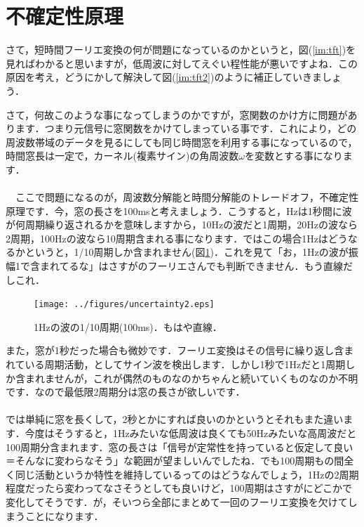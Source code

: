 \documentclass[11pt,a4paper]{ujreport} 	%
\begin{document}
\section{不確定性原理}
さて，短時間フーリエ変換の何が問題になっているのかというと，図(\ref{im:tft})を見ればわかると思いますが，低周波に対してえぐい程性能が悪いですよね．この原因を考え，どうにかして解決して図(\ref{im:tft2})のように補正していきましょう．

さて，何故このような事になってしまうのかですが，窓関数のかけ方に問題があります．つまり元信号に窓関数をかけてしまっている事です．これにより，どの周波数帯域のデータを見るにしても同じ時間窓を利用する事になっているので，時間窓長は一定で，カーネル(複素サイン)の角周波数$\omega$を変数とする事になります．\\
\\
　ここで問題になるのが，周波数分解能と時間分解能のトレードオフ，不確定性原理です．今，窓の長さを100msと考えましょう．こうすると，Hzは1秒間に波が何周期繰り返されるかを意味しますから，10Hzの波だと1周期，20Hzの波なら2周期，100Hzの波なら10周期含まれる事になります．ではこの場合1Hzはどうなるかというと，1/10周期しか含まれません(図\ref{im:uncertainty})．これを見て「お，1Hzの波が振幅1で含まれてるな」はさすがのフーリエさんでも判断できません．もう直線だしこれ．

\begin{figure}[H]
  \label{im:uncertainty}
  \centering
  \texttt{[image: ../figures/uncertainty2.eps]}
  \caption{1Hzの波の1/10周期(100ms)．もはや直線．}
\end{figure}

また，窓が1秒だった場合も微妙です．フーリエ変換はその信号に繰り返し含まれている周期活動，としてサイン波を検出します．しかし1秒で1Hzだと1周期しか含まれませんが，これが偶然のものなのかちゃんと続いていくものなのか不明です．なので最低限2周期分は窓の長さが欲しいです．\\\\

では単純に窓を長くして，2秒とかにすれば良いのかというとそれもまた違います．今度はそうすると，1Hzみたいな低周波は良くても50Hzみたいな高周波だと100周期分含まれます．窓の長さは「信号が定常性を持っていると仮定して良い＝そんなに変わらなそう」な範囲が望ましいんでしたね．でも100周期もの間全く同じ活動というか特性を維持しているってのはどうなんでしょう，1Hzの2周期程度だったら変わってなさそうとしても良いけど，100周期はさすがにどこかで変化してそうです．が，そいつら全部にまとめて一回のフーリエ変換を欠けてしまうことになります．\\
\end{document}
